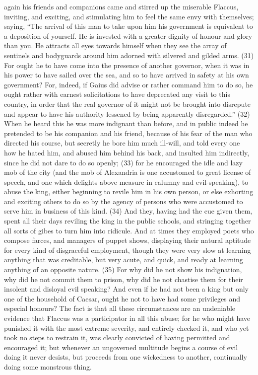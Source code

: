 again his friends and companions came and stirred up the miserable Flaccus, inviting, and exciting,
and stimulating him to feel the same envy with themselves; saying, ``The arrival of this man to take
upon him his government is equivalent to a deposition of yourself. He is invested with a greater
dignity of honour and glory than you. He attracts all eyes towards himself when they see the array
of sentinels and bodyguards around him adorned with silvered and gilded arms. (31) For ought he
to have come into the presence of another governor, when it was in his power to have sailed over
the sea, and so to have arrived in safety at his own government? For, indeed, if Gaius did advise
or rather command him to do so, he ought rather with earnest solicitations to have deprecated any
visit to this country, in order that the real governor of it might not be brought into disrepute and
appear to have his authority lessened by being apparently disregarded.'' (32) When he heard this
he was more indignant than before, and in public indeed he pretended to be his companion and his
friend, because of his fear of the man who directed his course, but secretly he bore him much
ill-will, and told every one how he hated him, and abused him behind his back, and insulted him
indirectly, since he did not dare to do so openly; (33) for he encouraged the idle and lazy mob of
the city (and the mob of Alexandria is one accustomed to great license of speech, and one which
delights above measure in calumny and evil-speaking), to abuse the king, either beginning to revile
him in his own person, or else exhorting and exciting others to do so by the agency of persons who
were accustomed to serve him in business of this kind. (34) And they, having had the cue given
them, spent all their days reviling the king in the public schools, and stringing together all sorts of
gibes to turn him into ridicule. And at times they employed poets who compose farces, and
managers of puppet shows, displaying their natural aptitude for every kind of disgraceful
employment, though they were very slow at learning anything that was creditable, but very acute,
and quick, and ready at learning anything of an opposite nature. (35) For why did he not show his
indignation, why did he not commit them to prison, why did he not chastise them for their insolent
and disloyal evil speaking? And even if he had not been a king but only one of the household of
Caesar, ought he not to have had some privileges and especial honours? The fact is that all these
circumstances are an undeniable evidence that Flaccus was a participator in all this abuse; for he
who might have punished it with the most extreme severity, and entirely checked it, and who yet
took no steps to restrain it, was clearly convicted of having permitted and encouraged it; but
whenever an ungoverned multitude begins a course of evil doing it never desists, but proceeds
from one wickedness to another, continually doing some monstrous thing.

